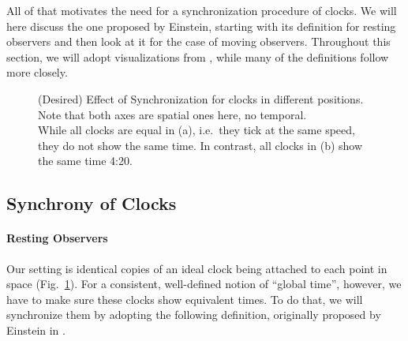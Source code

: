 \documentclass[../relativity_main.tex]{subfiles}
\begin{document}
All of that motivates the need for a synchronization procedure of clocks. We will here discuss the one proposed by Einstein, starting with its definition for resting observers and then look at it for the case of moving observers. Throughout this section, we will adopt visualizations from \cite{dragon_geometry_srt}, while many of the definitions follow \cite{giulini_srt} more closely.



\begin{figure}
	\centering
	
	\hspace*{0.1\textwidth}
	
	\caption[Effect of Synchronization]{(Desired) Effect of Synchronization for clocks in different positions. Note that both axes are spatial ones here, no temporal.\\
	While all clocks are equal in (a), i.e.~they tick at the same speed, they do not show the same time. In contrast, all clocks in (b) show the same time 4:20.}
	\label{fig:unsynchr_synchr_clocks}
\end{figure}



		\subsection{Synchrony of Clocks}
			\paragraph{Resting Observers}
Our setting is identical copies of an ideal clock being attached to each point in space (Fig.~\ref{fig:unsynchr_synchr_clocks}). For a consistent, well-defined notion of \enquote{global time}, however, we have to make sure these clocks show equivalent times. To do that, we will synchronize them by adopting the following definition, originally proposed by Einstein in \cite{Einstein_1905}.
\end{document}
